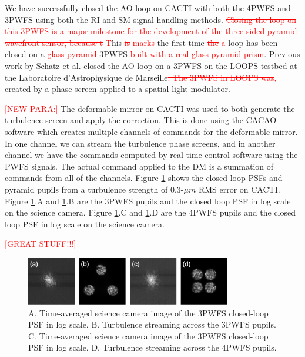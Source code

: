 \documentclass[12pt]{spieman}  %
\newcommand{\jrmadd}[1]{\textcolor{red}{#1}}
\newcommand{\jrmrmv}[1]{\textcolor{red}{\sout{#1}}}
\newcommand{\jrmcom}[1]{\textcolor{red}{[#1]}}
\begin{document}
\begin{spacing}{2}
We have successfully closed the AO loop on CACTI with both the 4PWFS and 3PWFS using both the RI and SM signal handling methods. \jrmrmv{Closing the loop on this 3PWFS is a major milestone for the development of the three-sided pyramid wavefront sensor, because t} \jrmadd{T}his \jrmrmv{is} \jrmadd{marks} the first time \jrmrmv{the} \jrmadd{a} loop has been closed on a \jrmadd{glass pyramid} 3PWFS\jrmrmv{ built with a real glass pyramid prism}. Previous work by Schatz et al. closed the AO loop on a 3PWFS on the LOOPS testbed at the Laboratoire d'Astrophysique de Marseille\jrmrmv{. The 3PWFS in LOOPS was}\jrmadd{,} created by a phase screen applied to a spatial light modulator. 

\jrmcom{NEW PARA:}
The deformable mirror on CACTI was used to both generate the turbulence screen and apply the correction. This is done using the CACAO software which creates multiple channels of commands for the deformable mirror. In one channel we can stream the turbulence phase screens, and in another channel we have the commands computed by real time control software using the PWFS signals. The actual command applied to the DM is a summation of commands from all of the channels. Figure \ref{fig:turbCACTI} shows the closed loop PSFs and pyramid pupils from a turbulence strength of 0.3-$\mu m$ RMS error on CACTI. Figure \ref{fig:turbCACTI}.A and \ref{fig:turbCACTI}.B are the 3PWFS pupils and the closed loop PSF in log scale on the science camera. Figure \ref{fig:turbCACTI}.C and \ref{fig:turbCACTI}.D are the 4PWFS pupils and the closed loop PSF in log scale on the science camera.

\jrmcom{GREAT STUFF!!!}

\begin{figure}
    \centering
    \includegraphics[width=0.8\textwidth]{turbCACTI.png}
    \caption{A. Time-averaged science camera image of the 3PWFS closed-loop PSF in log scale. B. Turbulence streaming across the 3PWFS pupils. C. Time-averaged science camera image of the 3PWFS closed-loop PSF in log scale. D. Turbulence streaming across the 4PWFS pupils.}
    \label{fig:turbCACTI}
\end{figure}


\end{spacing}
\end{document}
